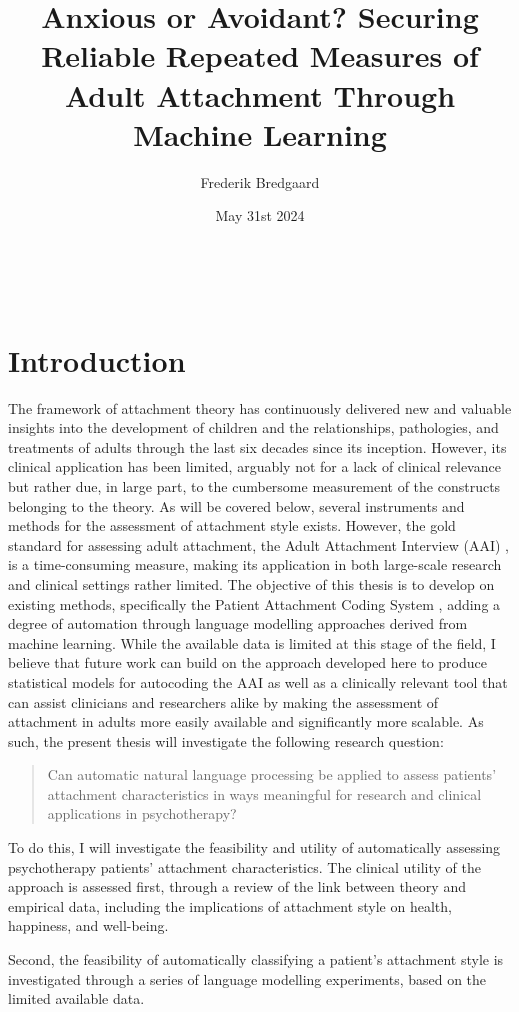 \documentclass[12pt]{report}
\title{Anxious or Avoidant? Securing Reliable Repeated Measures of Adult Attachment Through Machine Learning}
\author{Frederik Bredgaard}
\date{May 31st 2024}
\begin{document}
\maketitle
\
\tableofcontents

\chapter*{Introduction}
The framework of attachment theory has continuously delivered new and valuable insights into the development of children and the relationships, pathologies, and treatments of adults through the last six decades since its inception.
However, its clinical application has been limited, arguably not for a lack of clinical relevance but rather due, in large part, to the cumbersome measurement of the constructs belonging to the theory.
As will be covered below, several instruments and methods for the assessment of attachment style exists. However, the gold standard for assessing adult attachment, the Adult Attachment Interview (AAI) \cite{AAITest}, is a time-consuming measure, making its application in both large-scale research and clinical settings rather limited.
The objective of this thesis is to develop on existing methods, specifically the Patient Attachment Coding System \cite{Talia2017}, adding a degree of automation through language modelling approaches derived from machine learning.
While the available data is limited at this stage of the field, I believe that future work can build on the approach developed here to produce statistical models for autocoding the AAI as well as a clinically relevant tool that can assist clinicians and researchers alike by making the assessment of attachment in adults more easily available and significantly more scalable.
As such, the present thesis will investigate the following research question:
\begin{quote}
    Can automatic natural language processing be applied to assess patients' attachment characteristics in ways meaningful for research and clinical applications in psychotherapy?
\end{quote}
To do this, I will investigate the feasibility and utility of automatically assessing psychotherapy patients' attachment characteristics.
The clinical utility of the approach is assessed first, through a review of the link between theory and empirical data, including the implications of attachment style on health, happiness, and well-being.

Second, the feasibility of automatically classifying a patient's attachment style is investigated through a series of language modelling experiments, based on the limited available data.
\end{document}
